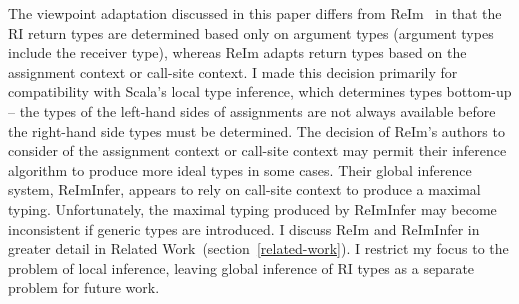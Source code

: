 \documentclass[letterpaper,11pt]{article}
\theoremstyle{definition}
\theoremstyle{remark}
\begin{document}
The viewpoint adaptation discussed in this paper differs from ReIm~\cite{reim} in that
the RI return types are determined based only on argument types
(argument types include the receiver type), whereas
ReIm adapts return types based on the assignment context or call-site context.
I made this decision primarily for compatibility with Scala's local type inference,
which determines types bottom-up -- the types of the left-hand sides
of assignments are not always available before the right-hand side types
must be determined.
The decision of ReIm's authors to consider of the assignment context or call-site context
may permit their inference algorithm to produce more ideal types
in some cases.
Their global inference system, ReImInfer, appears to rely
on call-site context to produce a maximal typing.
Unfortunately, the maximal typing produced by ReImInfer may become inconsistent
if generic types are introduced.
I discuss ReIm and ReImInfer in greater detail in Related Work~(section~\ref{related-work}).
I restrict my focus to the problem of local inference,
leaving global inference of RI types as a separate problem
for future work.

\begin{comment}
The difference is due to the nature of the inference used.
ReImInfer is a global inference system, but Scala uses local type inference.
Under local type inference, the type of the right-hand side of an assignment
is determined without taking the type of the left-hand side into account.
Therefore, we can expect the parameter types to be available at a function
application site, but not necessarily the type that the return value must
be adpated to.
Because of the restrictions of local type inference,
we cannot guarantee a ``best'' typing like ReImInfer.
However, we should note that ReImInfer does not support generic types,
and it is questionable whether the approach it takes can
find best typings that will type-check correctly in the presence of generics.
We consider global inference and local inference to be separate problems.
Where global inference addresses the issue of generating or suggesting annotations
for non-annotated code, local inference is normally used to reduce the programmer's
annotation burden when working with annotated code.
My work focuses on the integration of RI types with local type inference,
leaving global inference as a possibility for future work.
\end{comment}
\end{document}
